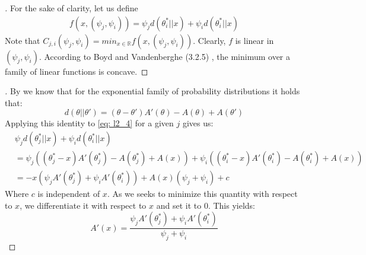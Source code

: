 \begin{proof}[]
  For the sake of clarity, let us define
  \begin{align}
    f(x, (\psi_j, \psi_i)) = \psi_j d(\theta_i^*||x) + \psi_i d(\theta_i^* || x)
  \end{align}
  Note that $C_{j, i}(\psi_j, \psi_i) = min_{x \in \mathbb{R}} f(x,(\psi_j, \psi_i))$. Clearly, $f$ is linear in $(\psi_j, \psi_i)$. According to Boyd and Vandenberghe (3.2.5) \cite{Boyd:2004:CO:993483}, the minimum over a family of linear functions is concave.
\end{proof}

\begin{proof}[]
  By  we know that for the exponential family of probability distributions it holds that:
  \[d(\theta||\theta') = (\theta - \theta')A'(\theta) - A(\theta) + A(\theta')\]
  Applying this identity to \eqref{eq: l2_4} for a given $j$ gives us:
  \begin{align}
    &\psi_{j}d(\theta^*_{j} || x) + \psi_{i}d(\theta_{i}^* ||x) \\
    &=\psi_j ((\theta_j^* - x)A'(\theta_j^*) - A(\theta_j^*) + A(x)) + \psi_i((\theta_i^* - x)A'(\theta_i^*) - A(\theta_i^*) + A(x))\\
    &= -x(\psi_j A'(\theta_j^*) + \psi_i A'(\theta_i^*)) + A(x)(\psi_j + \psi_i) + c
  \end{align}
  Where $c$ is independent of $x$. As we seeks to minimize this quantity with respect to $x$, we differentiate it with respect to $x$ and set it to 0. This yields:
  \[A'(x) = \frac{\psi_j A'(\theta_j^*) + \psi_i A'(\theta_i^*)}{\psi_j + \psi_i}\]
\end{proof}

